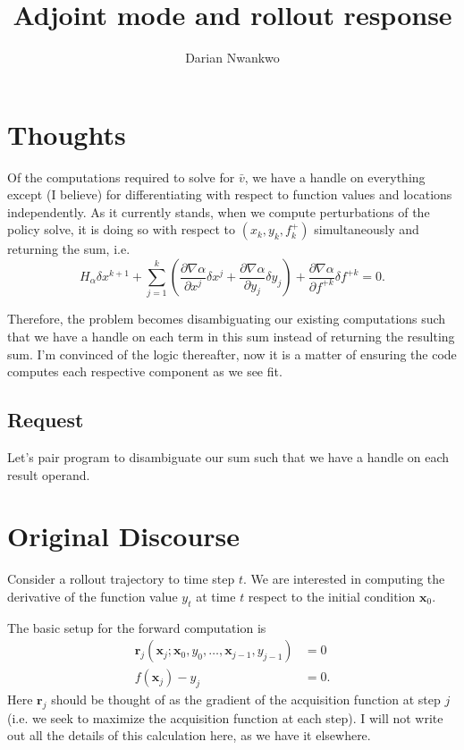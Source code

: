 \documentclass{article}
\title{Adjoint mode and rollout response}
\author{Darian Nwankwo}
\newcommand{\bfx}{\mathbf{x}}
\newcommand{\bfr}{\mathbf{r}}
\begin{document}
\maketitle

\section{Thoughts}
Of the computations required to solve for $\bar{v}$, we have a handle on everything except (I believe) for
differentiating with respect to function values and locations independently. As it currently stands, when we
compute perturbations of the policy solve, it is doing so with respect to $(x_k, y_k, f^+_k)$ simultaneously and returning
the sum, i.e.
\[
  H_{\alpha} \delta x^{k+1} + 
  \sum_{j=1}^k \left(
    \frac{\partial \nabla \alpha}{\partial x^j} \delta x^j +
    \frac{\partial \nabla \alpha}{\partial y_j} \delta y_j
  \right) +
  \frac{\partial \nabla \alpha}{\partial f^{+k}} \delta f^{+k} = 0.
\]

Therefore, the problem becomes disambiguating our existing computations such that we have a handle on each term in
this sum instead of returning the resulting sum. I'm convinced of the logic thereafter, now it is a matter of ensuring the
code computes each respective component as we see fit.

\subsection{Request}
Let's pair program to disambiguate our sum such that we have a handle on each result operand.

\section{Original Discourse}
Consider a rollout trajectory to time step $t$.  We are interested in
computing the derivative of the function value $y_t$ at time $t$ 
respect to the initial condition $\bfx_0$.

The basic setup for the forward computation is
\begin{align*}
  \bfr_j(\bfx_j; \bfx_0, y_0, \ldots, \bfx_{j-1}, y_{j-1}) &= 0 \\
  f(\bfx_j) - y_j &= 0.
\end{align*}
Here $\bfr_j$ should be thought of as the gradient of the acquisition
function at step $j$ (i.e. we seek to maximize the acquisition
function at each step).  I will not write out all the details of this
calculation here, as we have it elsewhere.
\end{document}
